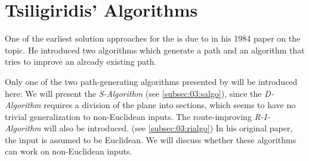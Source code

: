 \section{Tsiligiridis' Algorithms}
\label{sec:03:tsiligiridis}

One of the earliest solution approaches for the \op is due to \citeauthor{tsiligiridis_heuristic_1984} in his 1984 paper on the topic. \cite{tsiligiridis_heuristic_1984}
He introduced two algorithms which generate a path and an algorithm that tries to improve an already existing path.

Only one of the two path-generating algorithms presented by \citeauthor{tsiligiridis_heuristic_1984} will be introduced here:
We will present the \emph{S-Algorithm} (see \cref{subsec:03:salgo}), since the \emph{D-Algorithm} requires a division of the plane into sections, which seems to have no trivial generalization to non-Euclidean inputs.
The route-improving \emph{R-I-Algorithm} will also be introduced. (see \cref{subsec:03:rialgo})
In his original paper, the input is assumed to be Euclidean.
We will discuss whether these algorithms can work on non-Euclidean inputs.


%


